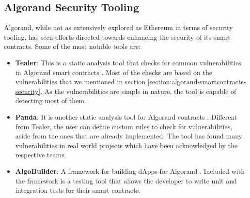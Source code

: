 
\subsection*{Algorand Security Tooling}
Algorand, while not as extensively explored as Ethereum in terms of security tooling, has seen efforts directed towards enhancing the security of its smart contracts. Some of the most notable tools are:
\begin{itemize}
    \item \textbf{Tealer}: This is a static analysis tool that checks for common vulnerabilities in Algorand smart contracts \cite{noauthor_crytictealer_nodate}.
          Most of the checks are based on the vulnerabilities that we mentioned in section \ref{section:algorand-smartcontracts-security}.
          As the vulnerabilities are simple in nature, the tool is capable of detecting most of them.

    \item \textbf{Panda}: It is another static analysis tool for Algorand contracts \cite{sun_panda_2023}.
          Different from Tealer, the user can define custom rules to check for vulnerabilities, aside from the ones that are already implemented.
          The tool has found many vulnerabilities in real world projects which have been acknowledged by the respective teams.
    \item \textbf{AlgoBuilder}: A framework for building \acp{dApp} for Algorand \cite{noauthor_algo_nodate}.
          Included with the framework is a testing tool that allows the developer to write unit and integration tests for their smart contracts.
\end{itemize}

